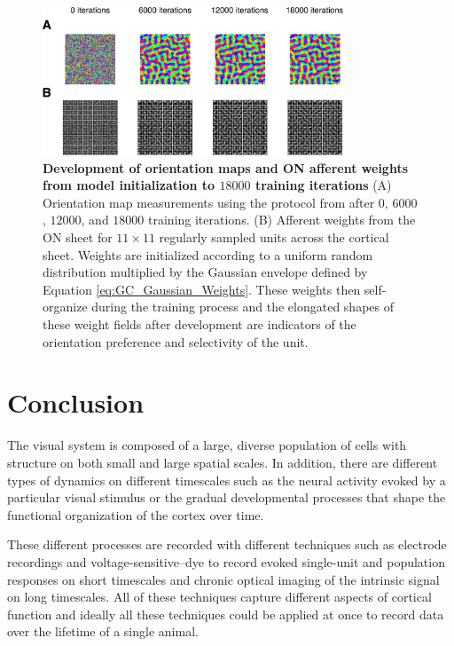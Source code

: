 \documentclass[phd,ianc,twoside]{infthesis}
\begin{document}
\begin{figure}
\center
\includegraphics[width=0.8\textwidth]{./figures/GCAL_Background_Development.pdf}
\caption{{\bf Development of orientation maps and ON afferent weights
    from model initialization to $18000$ training iterations} (A)
  Orientation map measurements using the protocol from
  \citet{stevens_jn13} after $0$, $6000$, $12000$, and $18000$ training
  iterations. (B) Afferent weights from the ON sheet for $11\times11$
  regularly sampled units across the cortical sheet. Weights are
  initialized according to a uniform random distribution multiplied by
  the Gaussian envelope defined by Equation
  \ref{eq:GC_Gaussian_Weights}.  These weights then self-organize during
  the training process and the elongated shapes of these weight fields
  after development are indicators of the orientation preference and
  selectivity of the unit.}
  \label{fig:GCAL_Background_Development}
\end{figure}

\section{Conclusion}

The visual system is composed of a large, diverse
population of cells with structure on both small and large spatial
scales. In addition, there are different types of dynamics on different
timescales such as the neural activity evoked by a particular visual
stimulus or the gradual developmental processes that shape the
functional organization of the cortex over time.

These different processes are recorded with different techniques such as
electrode recordings and voltage-sensitive--dye to record evoked
single-unit and population responses on short timescales and chronic
optical imaging of the intrinsic signal on long timescales. All of these
techniques capture different aspects of cortical function and ideally
all these techniques could be applied at once to record data over the
lifetime of a single animal.
\end{document}
